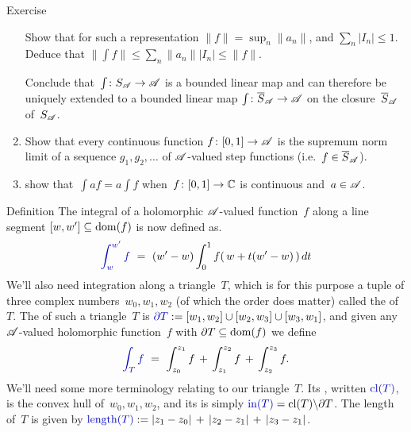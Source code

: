 \documentclass[a]{subfiles}
\begin{document}
\begin{parsec}
\begin{point}{Exercise}
\begin{enumerate}
Show that 
for such a representation
$\|f\|=\sup_n \|a_n\|$, and
$\sum_n \left|I_n\right|\leq 1$.
Deduce that
$\|\int f\| \leq \sum_n \|a_n\|\left|I_n\right|
\leq \|f\|$.

Conclude that~$\int\colon S_{\mathscr{A}}\to\mathscr{A}$
is a bounded linear map
and can therefore
be uniquely extended to a bounded linear map
$\int\colon \overline{S}_{\mathscr{A}}\to\mathscr{A}$
on the closure~$\overline{S}_{\mathscr{A}}$
of~$S_{\mathscr{A}}$.

\item
Show that every continuous function $f\colon [0,1]\to\mathscr{A}$
is the supremum norm limit
of a sequence $g_1,g_2,\dotsc$
of $\mathscr{A}$-valued step functions
 (i.e.~$f\in\overline{S}_{\mathscr{A}}$).

\item
show that~$\int af = a\int f$
when~$f\colon [0,1]\to\mathbb{C}$
is continuous and~$a\in \mathscr{A}$.
\end{enumerate}
\end{point}
\begin{point}{Definition}%
The integral of
a holomorphic $\mathscr{A}$-valued function~$f$
along a line segment $[w,w']\subseteq\operatorname{dom}(f)$
is now defined as.
\begin{equation*}
\Define{\int_{w}^{w'}f}
\ = \ 
(w'-w)\int_0^1f(\,w+t(w'-w)\,)\,dt
\end{equation*}
We'll also need integration along a triangle~$T$,
which is for this  purpose a tuple of three 
complex numbers~$w_0,w_1,w_2$
(of which the order does matter)
called the
 of~$T$.
The  of
such a triangle~$T$
is $\Define{\partial T}
:=[w_1,w_2]\cup [w_2,w_3]\cup [w_3,w_1]$,
and given any $\mathscr{A}$-valued
holomorphic function~$f$
with $\partial T\subseteq \operatorname{dom}(f)$
we define
\begin{equation*}
	\Define{\int_T f}\ = \ \int_{z_0}^{z_1} f
\,+\, \int_{z_1}^{z_2} f
\,+\, \int_{z_2}^{z_3} f.
\end{equation*}
We'll need some more terminology
relating to our triangle~$T$.
Its ,
written $\Define{\mathrm{cl}(T)}$,
is the convex hull of~$w_0,w_1,w_2$,
and its 
is simply
$\Define{\mathrm{in}(T)}=\mathrm{cl}(T)\backslash \partial T$.
The length
of~$T$ is given by
$\Define{\mathrm{length}(T)}:=
\left|z_1-z_0\right|\,+\,
\left|z_2-z_1\right|\,+\,
\left|z_3-z_1\right|$.


\end{point}
\end{parsec}
\end{document}
